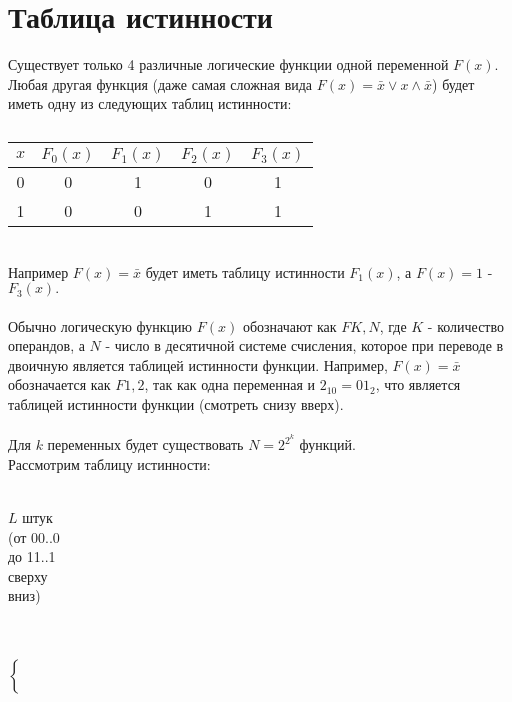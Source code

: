 \section{Таблица истинности}
Существует только 4 различные логические функции одной переменной $F(x)$. Любая другая функция (даже самая сложная вида $F(x) = \bar{x} \vee x \wedge \bar{x}$) будет иметь одну из следующих таблиц истинности:
\begin{table}[!h]
\begin{center} 
\caption{}
\begin{tabular}{|c||c|c|c|c|}
\hline
$x$ & $F_0(x)$ & $F_1(x)$ & $F_2(x)$ & $F_3(x)$ \\
\hline
\hline
0 & 0 & 1 & 0 & 1 \\
\hline
1 & 0 & 0 & 1 & 1 \\
\hline
\end{tabular}
\end{center} 
\end{table}
\\Например $F(x) = \bar{x}$ будет иметь таблицу истинности $F_1(x)$, а $F(x) = 1$ - $F_3(x).$
\\
\\Обычно логическую функцию $F(x)$ обозначают как $FK,N$, где $K$ - количество операндов, а $N$ - число в десятичной системе счисления, которое при переводе в двоичную является таблицей истинности функции. Например, $F(x) = \bar{x}$ обозначается как $F1,2$, так как одна переменная и $2_{10} = 01_{2}$, что является таблицей истинности функции (смотреть снизу вверх).
\\
\\Для $k$ переменных будет существовать $N = 2^{2^{k}}$ функций.
\\Рассмотрим таблицу истинности:
\\
\\
\begin{minipage}{2cm}
\begin{center}
$L$ штук\\
(от 00..0\\ до 11..1 \\ сверху \\ вниз)
\end{center}
\end{minipage}
\begin{minipage}{0.3cm}
\quad \\
\quad \\
$\left\{
\begin{array}{c}
\\
\\
\\
\\
\end{array}
\right.$
\quad \\
\end{minipage}
